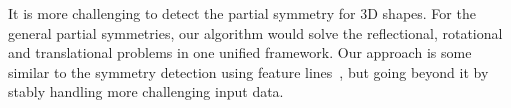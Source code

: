 It is more challenging to detect the partial symmetry for 3D shapes. For the general partial symmetries, our algorithm would solve the reflectional, rotational and translational problems in one unified framework. Our approach is some similar to the symmetry detection using feature lines~\cite{Berner2011}, but going beyond it by stably handling more challenging input data. 